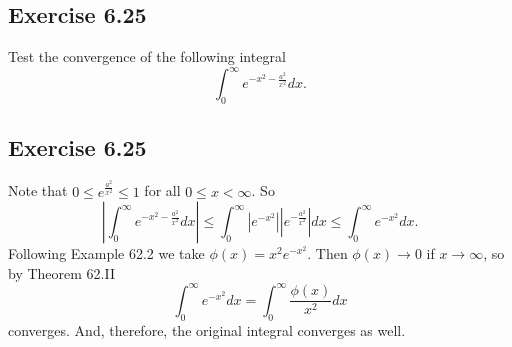 \subsection*{Exercise 6.25}

Test the convergence of the following integral
\begin{equation*}
    \int_0^{\infty} e^{-x^2 - \frac{a^2}{x^2}} dx.
\end{equation*}

\subsection*{Exercise 6.25}

Note that $0 \leq e^{\frac{a^2}{x^2}} \leq 1$ for all $0 \leq x < \infty$.
So
\begin{equation*}
    \left| \int_0^{\infty} e^{-x^2 - \frac{a^2}{x^2}} dx \right|
        \leq \int_0^{\infty} \left|e^{-x^2}\right| \left|e^{-\frac{a^2}{x^2}}\right| dx
        \leq \int_0^{\infty} e^{-x^2} dx.
\end{equation*}
Following Example 62.2 we take $\phi(x) = x^2e^{-x^2}$.
Then $\phi(x) \to 0$ if $x \to \infty$, so by Theorem 62.II
\begin{equation*}
    \int_0^{\infty} e^{-x^2} dx = \int_0^{\infty} \frac{\phi(x)}{x^2} dx
\end{equation*}
converges.
And, therefore, the original integral converges as well.
